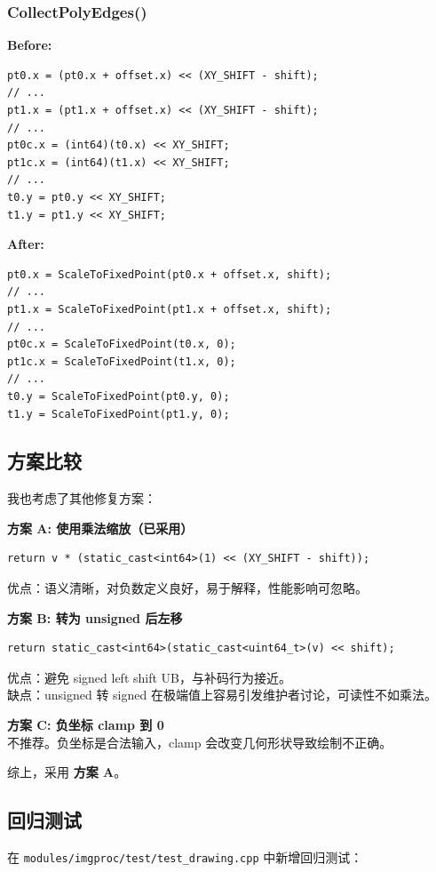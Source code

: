 \documentclass[12pt,a4paper]{article}
\begin{document}
\subsubsection{CollectPolyEdges()}

\textbf{Before:}
\begin{lstlisting}
pt0.x = (pt0.x + offset.x) << (XY_SHIFT - shift);
// ...
pt1.x = (pt1.x + offset.x) << (XY_SHIFT - shift);
// ...
pt0c.x = (int64)(t0.x) << XY_SHIFT;
pt1c.x = (int64)(t1.x) << XY_SHIFT;
// ...
t0.y = pt0.y << XY_SHIFT;
t1.y = pt1.y << XY_SHIFT;
\end{lstlisting}

\textbf{After:}
\begin{lstlisting}
pt0.x = ScaleToFixedPoint(pt0.x + offset.x, shift);
// ...
pt1.x = ScaleToFixedPoint(pt1.x + offset.x, shift);
// ...
pt0c.x = ScaleToFixedPoint(t0.x, 0);
pt1c.x = ScaleToFixedPoint(t1.x, 0);
// ...
t0.y = ScaleToFixedPoint(pt0.y, 0);
t1.y = ScaleToFixedPoint(pt1.y, 0);
\end{lstlisting}

\subsection{方案比较}

我也考虑了其他修复方案：

\textbf{方案 A: 使用乘法缩放（已采用）}
\begin{lstlisting}
return v * (static_cast<int64>(1) << (XY_SHIFT - shift));
\end{lstlisting}
优点：语义清晰，对负数定义良好，易于解释，性能影响可忽略。

\textbf{方案 B: 转为 unsigned 后左移}
\begin{lstlisting}
return static_cast<int64>(static_cast<uint64_t>(v) << shift);
\end{lstlisting}
优点：避免 signed left shift UB，与补码行为接近。\\
缺点：unsigned 转 signed 在极端值上容易引发维护者讨论，可读性不如乘法。

\textbf{方案 C: 负坐标 clamp 到 0}\\
不推荐。负坐标是合法输入，clamp 会改变几何形状导致绘制不正确。

综上，采用 \textbf{方案 A}。

\subsection{回归测试}

在 \texttt{modules/imgproc/test/test\_drawing.cpp} 中新增回归测试：
\end{document}
